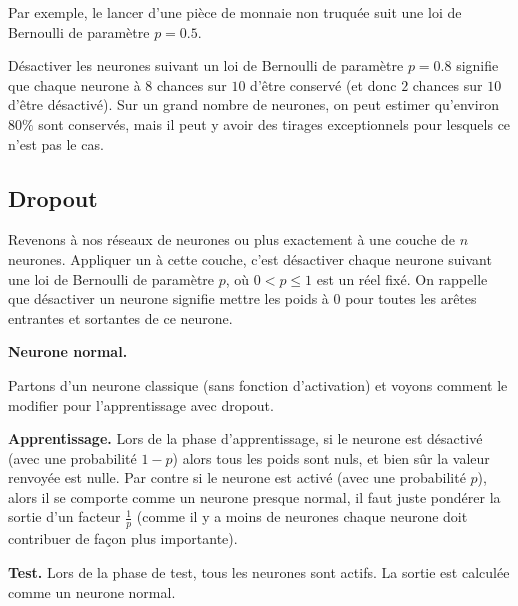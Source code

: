 \documentclass[11pt,class=report,crop=false]{standalone}
\begin{document}
Par exemple, le lancer d'une pièce de monnaie non truquée suit une loi de Bernoulli de paramètre $p=0.5$.

Désactiver les neurones suivant un loi de Bernoulli de paramètre $p=0.8$ signifie que chaque neurone à $8$ chances sur $10$ d'être conservé (et donc $2$ chances sur $10$ d'être désactivé).
Sur un grand nombre de neurones, on peut estimer qu'environ $80\%$ sont conservés, mais il peut y avoir des tirages exceptionnels pour lesquels ce n'est pas le cas.


\subsection{Dropout}

Revenons à nos réseaux de neurones ou plus exactement à une couche de $n$ neurones.
Appliquer un  à cette couche, c'est désactiver chaque neurone suivant une loi de Bernoulli de paramètre $p$, où $0 < p \le 1$ est un réel fixé.
On rappelle que désactiver un neurone signifie mettre les poids à $0$ pour toutes les arêtes entrantes et sortantes de ce neurone.


\textbf{Neurone \og{}normal\fg{}.}

Partons d'un neurone classique (sans fonction d'activation) et voyons comment le modifier pour l'apprentissage avec dropout.




\textbf{Apprentissage.}
Lors de la phase d'apprentissage, si le neurone est désactivé (avec une probabilité $1-p$) alors tous les poids sont nuls, et bien sûr la valeur renvoyée est nulle.
Par contre si le neurone est activé (avec une probabilité $p$), alors il se comporte comme un neurone \og{}presque normal\fg{}, il faut juste pondérer la sortie d'un facteur $\frac1p$ (comme il y a moins de neurones chaque neurone doit contribuer de façon plus importante).



\textbf{Test.}
Lors de la phase de test, tous les neurones sont actifs. La sortie est calculée comme un neurone normal.

\end{document}
